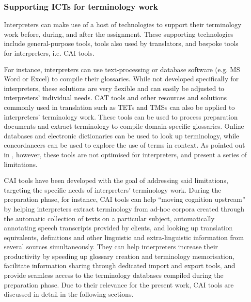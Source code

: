 \subsubsection{Supporting ICTs for terminology work}
Interpreters can make use of a host of technologies to support their terminology work before, during, and after the assignment. These supporting technologies include general-purpose tools, tools also used by translators, and bespoke tools for interpreters, i.e. CAI tools.

For instance, interpreters can use text-processing or database software (e.g. MS Word or Excel) to compile their glossaries. While not developed specifically for interpreters, these solutions are very flexible and can easily be adjusted to interpreters' individual needs.
CAT tools and other resources and solutions commonly used in translation such as TETs and TMSs can also be applied to interpreters' terminology work. These tools can be used to process preparation documents and extract terminology to compile domain-specific glossaries. Online databases and electronic dictionaries can be used to look up terminology, while concordancers can be used to explore the use of terms in context. As pointed out in , however, these tools are not optimised for interpreters, and present a series of limitations.

\begin{sloppypar}
CAI tools have been developed with the goal of addressing said limitations, targeting the specific needs of interpreters' terminology work. During the preparation phase, for instance, CAI tools can help ``moving cognition upstream'' \citep{stoll_jenseits_2009} by helping interpreters extract terminology from ad-hoc corpora created through the automatic collection of texts on a particular subject, automatically annotating speech transcripts provided by clients, and looking up translation equivalents, definitions and other linguistic and extra-linguistic information from several sources simultaneously. They can help interpreters increase their productivity by speeding up glossary creation and terminology memorisation, facilitate information sharing through dedicated import and export tools, and provide seamless access to the terminology databases compiled during the preparation phase. Due to their relevance for the present work, CAI tools are discussed in detail in the following sections.
\end{sloppypar}

